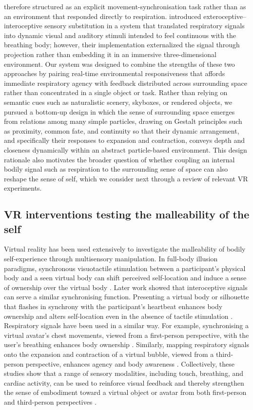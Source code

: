 therefore structured as an explicit movement-synchronisation task rather than as an environment that responded directly to respiration. \citet{GoralEtAl2024} introduced exteroceptive--interoceptive sensory substitution in a system that translated respiratory signals into dynamic visual and auditory stimuli intended to feel continuous with the breathing body; however, their implementation externalized the signal through projection rather than embedding it in an immersive three-dimensional environment. Our system was designed to combine the strengths of these two approaches by pairing real-time environmental responsiveness that affords immediate respiratory agency with feedback distributed across surrounding space rather than concentrated in a single object or task. Rather than relying on semantic cues such as naturalistic scenery, skyboxes, or rendered objects, we pursued a bottom-up design in which the sense of surrounding space emerges from relations among many simple particles, drawing on Gestalt principles such as proximity, common fate, and continuity \citep{Wagemans2012} so that their dynamic arrangement, and specifically their responses to expansion and contraction, conveys depth and closeness dynamically within an abstract particle-based environment. This design rationale also motivates the broader question of whether coupling an internal bodily signal such as respiration to the surrounding sense of space can also reshape the sense of self, which we consider next through a review of relevant VR experiments.

\subsection{VR interventions testing the malleability of the self}
Virtual reality has been used extensively to investigate the malleability of bodily self-experience through multisensory manipulation. In full-body illusion paradigms, synchronous visuotactile stimulation between a participant's physical body and a seen virtual body can shift perceived self-location and induce a sense of ownership over the virtual body \citep{Lenggenhager2007, Petkova2008}. Later work showed that interoceptive signals can serve a similar synchronising function. Presenting a virtual body or silhouette that flashes in synchrony with the participant's heartbeat enhances body ownership and alters self-location even in the absence of tactile stimulation \citep{Aspell2013, Suzuki2013}. Respiratory signals have been used in a similar way. For example, synchronising a virtual avatar's chest movements, viewed from a first-person perspective, with the user's breathing enhances body ownership \citep{MontiEtAl2020}. Similarly, mapping respiratory signals onto the expansion and contraction of a virtual bubble, viewed from a third-person perspective, enhances agency and body awareness \citep{Wald2023}. Collectively, these studies show that a range of sensory modalities, including touch, breathing, and cardiac activity, can be used to reinforce visual feedback and thereby strengthen the sense of embodiment toward a virtual object or avatar from both first-person and third-person perspectives \citep{Lenggenhager2007, Petkova2008, Aspell2013, Suzuki2013, MontiEtAl2020, Wald2023}.


